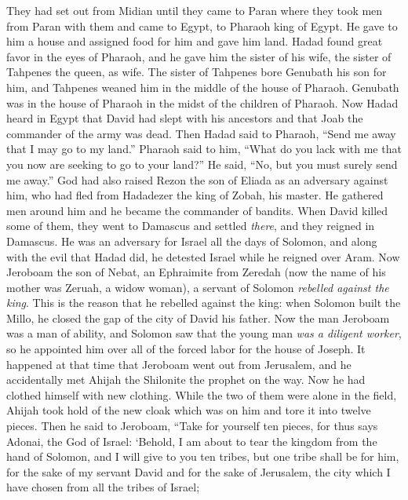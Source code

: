 \begin{biblechapter}
\verse They had set out from Midian until they came to Paran where they took men from Paran with them and came to Egypt, to Pharaoh king of Egypt. He gave to him a house and assigned food for him and gave him land.
\verse Hadad found great favor in the eyes of Pharaoh, and he gave him the sister of his wife, the sister of Tahpenes the queen, as wife.
\verse The sister of Tahpenes bore Genubath his son for him, and Tahpenes weaned him in the middle of the house of Pharaoh. Genubath was in the house of Pharaoh in the midst of the children of Pharaoh.
\verse Now Hadad heard in Egypt that David had slept with his ancestors and that Joab the commander of the army was dead. Then Hadad said to Pharaoh, “Send me away that I may go to my land.”
\verse Pharaoh said to him, “What do you lack with me that you now are seeking to go to your land?” He said, “No, but you must surely send me away.”
\verse God had also raised Rezon the son of Eliada as an adversary against him, who had fled from Hadadezer the king of Zobah, his master.
\verse He gathered men around him and he became the commander of bandits. When David killed some of them, they went to Damascus and settled \textit{there}, and they reigned in Damascus.
\verse He was an adversary for Israel all the days of Solomon, and along with the evil that Hadad did, he detested Israel while he reigned over Aram.
 Now Jeroboam the son of Nebat, an Ephraimite from Zeredah (now the name of his mother was Zeruah, a widow woman), a servant of Solomon \textit{rebelled against the king}.
\verse This is the reason that he rebelled against the king: when Solomon built the Millo, he closed the gap of the city of David his father.
\verse Now the man Jeroboam was a man of ability, and Solomon saw that the young man \textit{was a diligent worker}, so he appointed him over all of the forced labor for the house of Joseph.
\verse It happened at that time that Jeroboam went out from Jerusalem, and he accidentally met Ahijah the Shilonite the prophet on the way. Now he had clothed himself with new clothing. While the two of them were alone in the field,
\verse Ahijah took hold of the new cloak which was on him and tore it into twelve pieces.
\verse Then he said to Jeroboam, “Take for yourself ten pieces, for thus says Adonai, the God of Israel: ‘Behold, I am about to tear the kingdom from the hand of Solomon, and I will give to you ten tribes,
\verse but one tribe shall be for him, for the sake of my servant David and for the sake of Jerusalem, the city which I have chosen from all the tribes of Israel;

\end{biblechapter}
